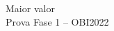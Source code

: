 
\begin{center}
  {\huge \sf Maior valor}\\[3mm]
  {\large \sf Prova Fase 1 -- OBI2022}
\end{center}

